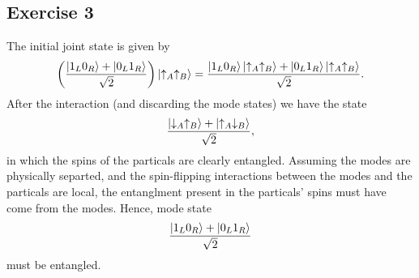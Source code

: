 \documentclass[12pt]{article}
\begin{document}
\subsection*{Exercise 3}
The initial joint state is given by
\[ \left(\frac{\ket{1_L0_R} + \ket{0_L1_R}}{\sqrt{2}}\right)\ket{\uparrow_A\uparrow_B} = \frac{\ket{1_L0_R}\ket{\uparrow_A\uparrow_B} + \ket{0_L1_R}\ket{\uparrow_A\uparrow_B}}{\sqrt{2}}. \]
After the interaction (and discarding the mode states) we have the state
\[ \frac{\ket{\downarrow_A\uparrow_B} + \ket{\uparrow_A\downarrow_B}}{\sqrt{2}}, \]
in which the spins of the particals are clearly entangled. Assuming the modes are physically separted, and the spin-flipping interactions between the modes and the particals are local, the entanglment present in the particals' spins must have come from the modes. Hence, mode state
\[ \frac{\ket{1_L0_R} + \ket{0_L1_R}}{\sqrt{2}} \]
must be entangled.
\end{document}
